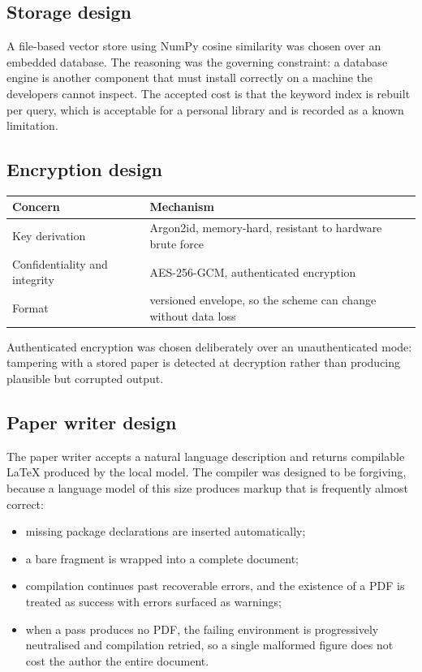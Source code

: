 \documentclass[11pt,a4paper]{article}
\begin{document}
\subsection{Storage design}

A file-based vector store using NumPy cosine similarity was chosen over an
embedded database. The reasoning was the governing constraint: a database
engine is another component that must install correctly on a machine the
developers cannot inspect. The accepted cost is that the keyword index is
rebuilt per query, which is acceptable for a personal library and is recorded as
a known limitation.

\subsection{Encryption design}

\begin{center}
\small
\begin{tabular}{@{}ll@{}}
\toprule
\textbf{Concern} & \textbf{Mechanism} \\
\midrule
Key derivation & Argon2id, memory-hard, resistant to hardware brute force \\
Confidentiality and integrity & AES-256-GCM, authenticated encryption \\
Format & versioned envelope, so the scheme can change without data loss \\
\bottomrule
\end{tabular}
\end{center}

Authenticated encryption was chosen deliberately over an unauthenticated mode:
tampering with a stored paper is detected at decryption rather than producing
plausible but corrupted output.

\subsection{Paper writer design}

The paper writer accepts a natural language description and returns compilable
LaTeX produced by the local model. The compiler was designed to be forgiving,
because a language model of this size produces markup that is frequently almost
correct:

\begin{itemize}[leftmargin=*]
  \item missing package declarations are inserted automatically;
  \item a bare fragment is wrapped into a complete document;
  \item compilation continues past recoverable errors, and the existence of a
        PDF is treated as success with errors surfaced as warnings;
  \item when a pass produces no PDF, the failing environment is progressively
        neutralised and compilation retried, so a single malformed figure does
        not cost the author the entire document.
\end{itemize}
\end{document}
